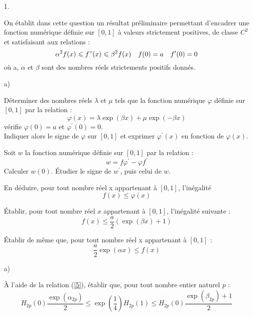\documentclass[11pt]{article}%
\begin{document}
\begin{noliste}{1.}
 \setlength{\itemsep}{4mm}
\item On établit dans cette question un résultat préliminaire
permettant
d'encadrer une fonction numérique définie sur $[0,1]$ à valeurs
strictement
positives, de classe $C^{2}$ et satisfaisant aux relations : 
\begin{equation}
\alpha ^{2}f(x)\leq f"(x)\leq \beta ^{2}f(x)\quad f(0) = a\quad
f^{\prime }(0) = 0 \label{6}
\end{equation}où a, $\alpha $ et $\beta $ sont des nombres réels
strictements positifs donnés.

\begin{noliste}{a)}
 \setlength{\itemsep}{2mm}
\item Déterminer des nombres réels $\lambda $ et $\mu $ tels que la
fonction
numérique $\varphi $ définie sur $[0,1]$ par la relation : 
\[
\varphi (x) = \lambda \exp (\beta x) + \mu \exp (-\beta x)
\]
vérifie $\varphi (0) = a$ et $\varphi ^{\prime }(0) = 0$.\\
Indiquer alors le signe de $\varphi $ sur $[0,1]$ et exprimer $\varphi
^{\prime }(x)$ en fonction de $\varphi (x)$.

\item Soit $w$ la fonction numérique définie sur $[0,1]$ par la
relation :
\[
w = f\varphi ^{\prime }-\varphi f^{\prime }
\]
Calculer $w(0)$. Étudier le signe de $w^{\prime }$, puis celui de $w$.

\item En déduire, pour tout nombre réel x appartenant à $[0,1]$,
l'inégalité
\[
f(x)\leq \varphi (x)
\]

\item Établir, pour tout nombre réel $x$ appartenant à $[0,1]$,
l'inégalité
suivante :\begin{equation}
f(x)\leq \dfrac{a}{2}(\exp (\beta x) + 1) \label{7}
\end{equation}

\item Établir de même que, pour tout nombre réel x appartenant à
$[0,1]$ :\begin{equation}
\dfrac{a}{2}\exp (\alpha x)\leq f(x) \label{8}
\end{equation}
\end{noliste}

\item 

\begin{noliste}{a)}
 \setlength{\itemsep}{2mm}
\item À l'aide de la relation (\ref{5}), établir que, pour tout nombre
entier naturel $p$ :
\[
H_{2p}(0)\dfrac{\exp (\alpha_{2p})}{2}\leq \exp
(\dfrac{1}{4})H_{2p}(1)\leq H_{2p}(0)\dfrac{\exp (\beta_{2p}) + 1}{2}
\]


\end{noliste}
\end{noliste}
\end{document}
